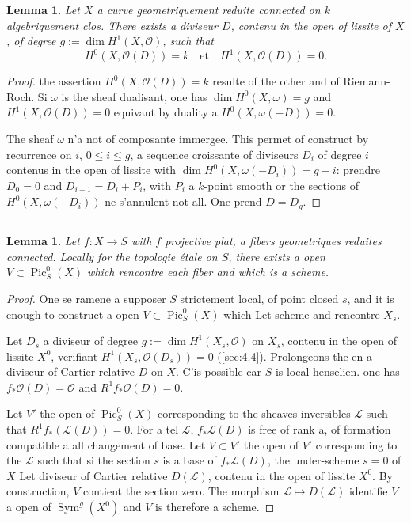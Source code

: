 \documentclass[12pt,a4paper]{article}
\theoremstyle{plain}
\newtheorem{lemma}[theorem]{Lemma}
\theoremstyle{definition}
\theoremstyle{remark}
\DeclareMathOperator{\Pic}{Pic}
\DeclareMathOperator{\Sym}{Sym}
\newcommand{\cO}{\mathcal{O}}
\begin{document}
\begin{lemma}
Let $X$ a curve geometriquement reduite connected on $k$ algebriquement clos. There exists a diviseur $D$, contenu in the open of lissite of $X$, of degree $g := \dim H^1(X, \cO)$, such that
\[
H^0(X, \cO(D)) = k \quad \text{et} \quad H^1(X, \cO(D)) = 0.
\]
\end{lemma}

\begin{proof}
the assertion $H^0(X, \cO(D)) = k$ resulte of the other and of Riemann-Roch. Si $\omega$ is the sheaf dualisant, one has $\dim H^0(X, \omega) = g$ and $H^1(X, \cO(D)) = 0$ equivaut by duality a $H^0(X, \omega(-D)) = 0$.

The sheaf $\omega$ n'a not of composante immergee. This permet of construct by recurrence on $i$, $0 \leq i \leq g$, a sequence croissante of diviseurs $D_i$ of degree $i$ contenus in the open of lissite with $\dim H^0(X, \omega(-D_i)) = g-i$: prendre $D_0 = 0$ and $D_{i+1} = D_i + P_i$, with $P_i$ a $k$-point smooth or the sections of $H^0(X, \omega(-D_i))$ ne s'annulent not all. One prend $D = D_g$.
\end{proof}

\subsection{}\label{sec:4.5}

\begin{lemma}
Let $f : X \to S$ with $f$ projective plat, a fibers geometriques reduites connected. Locally for the topologie étale on $S$, there exists a open $V \subset \Pic_S^0(X)$ which rencontre each fiber and which is a scheme.
\end{lemma}

\begin{proof}
One se ramene a supposer $S$ strictement local, of point closed $s$, and it is enough to construct a open $V \subset \Pic_S^0(X)$ which Let scheme and rencontre $X_s$.

Let $D_s$ a diviseur of degree $g := \dim H^1(X_s, \cO)$ on $X_s$, contenu in the open of lissite $X^0$, verifiant $H^1(X_s, \cO(D_s)) = 0$ (\ref{sec:4.4}). Prolongeons-the en a diviseur of Cartier relative $D$ on $X$. C'is possible car $S$ is local henselien. one has $f_* \cO(D) = \cO$ and $R^1 f_* \cO(D) = 0$.

Let $V'$ the open of $\Pic_S^0(X)$ corresponding to the sheaves inversibles $\mathcal{L}$ such that $R^1 f_* (\mathcal{L}(D)) = 0$. For a tel $\mathcal{L}$, $f_* \mathcal{L}(D)$ is free of rank a, of formation compatible a all changement of base. Let $V \subset V'$ the open of $V'$ corresponding to the $\mathcal{L}$ such that si the section $s$ is a base of $f_* \mathcal{L}(D)$, the under-scheme $s = 0$ of $X$ Let diviseur of Cartier relative $D(\mathcal{L})$, contenu in the open of lissite $X^0$. By construction, $V$ contient the section zero. The morphism $\mathcal{L} \mapsto D(\mathcal{L})$ identifie $V$ a open of $\Sym^g(X^0)$ and $V$ is therefore a scheme.
\end{proof}
\end{document}
